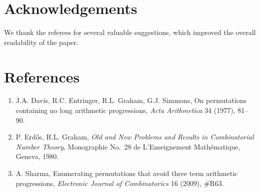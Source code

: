 \documentclass[10pt]{article}
\begin{document}
\section*{Acknowledgements}

We thank the referees for several valuable suggestions, which improved the
overall readability of the paper.

\section*{References}

\begin{enumerate}
\item J.A. Davis, R.C. Entringer, R.L. Graham, G.J. Simmons,
  On permutations containing no long arithmetic progressions,
  \emph{Acta Arithmetica} 34 (1977), 81--90.

\item P. Erd\H{o}s, R.L. Graham,
  \emph{Old and New Problems and Results in Combinatorial Number Theory},
  Monographie No.~28 de L'Enseignement Math\'ematique, Geneva, 1980.

\item A. Sharma,
  Enumerating permutations that avoid three term arithmetic progressions,
  \emph{Electronic Journal of Combinatorics} 16 (2009), \#R63.
\end{enumerate}
\end{document}
